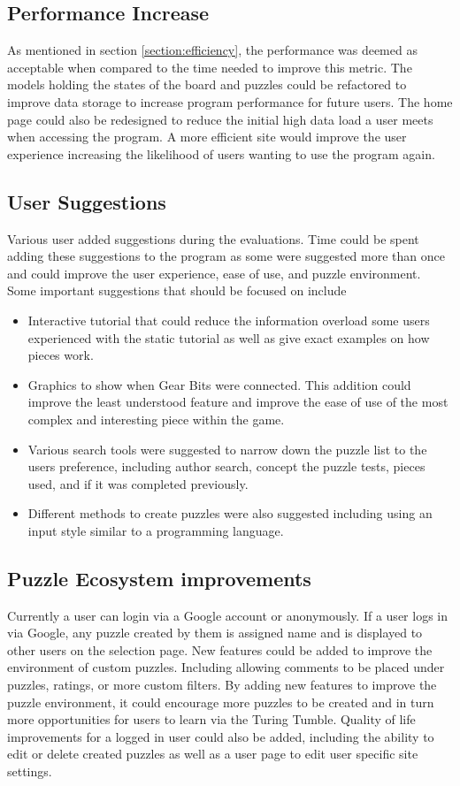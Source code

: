 \documentclass{l4proj}
\begin{document}
\subsection{Performance Increase}
As mentioned in section \ref{section:efficiency}, the performance was deemed as acceptable when compared to the time needed to improve this metric. The models holding the states of the board and puzzles could be refactored to improve data storage to increase program performance for future users. The home page could also be redesigned to reduce the initial high data load a user meets when accessing the program. A more efficient site would improve the user experience increasing the likelihood of users wanting to use the program again. 

\subsection{User Suggestions}
Various user added suggestions during the evaluations. Time could be spent adding these suggestions to the program as some were suggested more than once and could improve the user experience, ease of use, and puzzle environment. Some important suggestions that should be focused on include 
\begin{itemize}
    \item Interactive tutorial that could reduce the information overload some users experienced with the static tutorial as well as give exact examples on how pieces work.
    \item Graphics to show when Gear Bits were connected. This addition could improve the least understood feature and improve the ease of use of the most complex and interesting piece within the game.
    \item Various search tools were suggested to narrow down the puzzle list to the users preference, including author search, concept the puzzle tests, pieces used, and if it was completed previously.
    \item Different methods to create puzzles were also suggested including using an input style similar to a programming language.
\end{itemize}


\subsection{Puzzle Ecosystem improvements}
Currently a user can login via a Google account or anonymously. If a user logs in via Google, any puzzle created by them is assigned name and is displayed to other users on the selection page. New features could be added to improve the environment of custom puzzles. Including allowing comments to be placed under puzzles, ratings, or more custom filters. By adding new features to improve the puzzle environment, it could encourage more puzzles to be created and in turn more opportunities for users to learn via the Turing Tumble. Quality of life improvements for a logged in user could also be added, including the ability to edit or delete created puzzles as well as a user page to edit user specific site settings.
\end{document}
